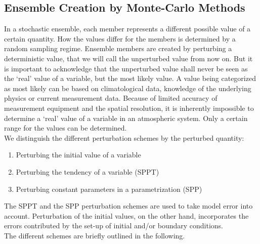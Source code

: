 \subsection{Ensemble Creation by Monte-Carlo Methods}
\label{sec:Monte}
In a stochastic ensemble, each member represents a different possible value of a certain quantity. How the values differ for the members is determined by a random sampling regime. Ensemble members are created by perturbing a deterministic value, that we will call the unperturbed value from now on. But it is important to acknowledge that the unperturbed value shall never be seen as the `real' value of a variable, but the most likely value. A value being categorized as most likely can be based on climatological data, knowledge of the underlying physics or current measurement data. Because of limited accuracy of measurement equipment and the spatial resolution, it is inherently impossible to determine a `real' value of a variable in an atmospheric system. Only a certain range for the values can be determined. \\
We distinguish the different perturbation schemes by the perturbed quantity:
\begin{enumerate}
    \item {Perturbing the initial value of a variable}
    \item {Perturbing the tendency of a variable (SPPT)}
    \item {Perturbing constant parameters in a parametrization (SPP)}
\end{enumerate}
The SPPT and the SPP perturbation schemes are used to take model error into account. Perturbation of the initial values, on the other hand,  incorporates the errors contributed by the set-up of initial and/or boundary conditions.\\
The different schemes are briefly outlined in the following. 

